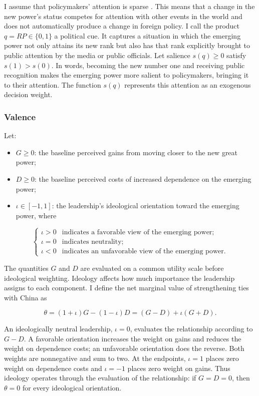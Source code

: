 \documentclass[referee,pdflatex,sn-basic]{sn-jnl}
\providecommand{\tightlist}{%
  \setlength{\itemsep}{0pt}\setlength{\parskip}{0pt}}
\theoremstyle{thmstylethree}
\begin{document}
I assume that policymakers' attention is sparse \citep{gabaix2014}. This means that a change in the new power's status competes for attention with other events in the world and does not automatically produce a change in foreign policy. I call the product \(q=RP\in\{0,1\}\) a political cue. It captures a situation in which the emerging power not only attains its new rank but also has that rank explicitly brought to public attention by the media or public officials. Let salience \(s(q)\geq0\) satisfy \(s(1)>s(0)\). In words, becoming the new number one and receiving public recognition makes the emerging power more salient to policymakers, bringing it to their attention. The function \(s(q)\) represents this attention as an exogenous decision weight.

\subsubsection{Valence}\label{valence}

Let:

\begin{itemize}
\tightlist
\item
  \(G\geq0\): the baseline perceived gains from moving closer to the new great power;
\item
  \(D\geq0\): the baseline perceived costs of increased dependence on the emerging power;
\item
  \(\iota\in[-1,1]\): the leadership's ideological orientation toward the emerging power, where
\end{itemize}

\[
\begin{cases}
\iota>0 & \text{indicates a favorable view of the emerging power;}\\
\iota=0 & \text{indicates neutrality;}\\
\iota<0 & \text{indicates an unfavorable view of the emerging power.}
\end{cases}
\]

The quantities \(G\) and \(D\) are evaluated on a common utility scale before ideological weighting. Ideology affects how much importance the leadership assigns to each component. I define the net marginal value of strengthening ties with China as

\[
\theta=(1+\iota)G-(1-\iota)D
      =(G-D)+\iota(G+D).
\]

An ideologically neutral leadership, \(\iota=0\), evaluates the relationship according to \(G-D\). A favorable orientation increases the weight on gains and reduces the weight on dependence costs; an unfavorable orientation does the reverse. Both weights are nonnegative and sum to two. At the endpoints, \(\iota=1\) places zero weight on dependence costs and \(\iota=-1\) places zero weight on gains. Thus ideology operates through the evaluation of the relationship: if \(G=D=0\), then \(\theta=0\) for every ideological orientation.
\end{document}
